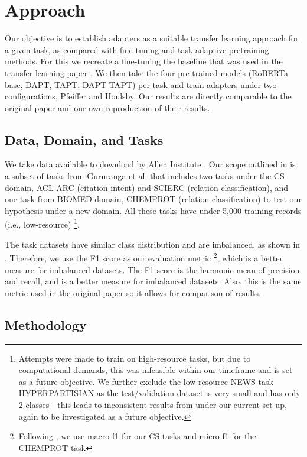 \documentclass[10pt,twocolumn,letterpaper]{article}
\begin{document}
\section{Approach}
Our objective is to establish adapters as a suitable transfer learning approach for a given task, as compared with fine-tuning and task-adaptive pretraining methods. For this we recreate a fine-tuning the baseline that was used in the transfer learning paper \cite{gururangan2020dont}. We then take the four pre-trained models (RoBERTa base, DAPT, TAPT, DAPT-TAPT) per task and train adapters under two configurations, Pfeiffer and Houlsby. Our results are directly comparable to the original paper \cite{gururangan2020dont} and our own reproduction of their results.

\subsection{Data, Domain, and Tasks} 
We take data available to download by Allen Institute \cite{allenai_dont_stop_pretraining}. Our scope outlined in  is a subset of tasks from Gururanga et al. \cite{gururangan2020dont} that includes two tasks under the CS domain, ACL-ARC (citation-intent) and SCIERC (relation classification), and one task from BIOMED domain, CHEMPROT (relation classification) to test our hypothesis under a new domain. All these tasks have under 5,000 training records (i.e., low-resource) \footnote{Attempts were made to train on high-resource tasks, but due to computational demands, this was infeasible within our timeframe and is set as a future objective. We further exclude the low-resource NEWS task HYPERPARTISIAN as the test/validation dataset is very small and has only 2 classes - this leads to inconsistent results from \cite{allenai_dont_stop_pretraining} under our current set-up, again to be investigated as a future objective.}.

The task datasets have similar class distribution and are imbalanced, as shown in . Therefore, we use the F1 score as our evaluation metric \footnote{Following \cite{gururangan2020dont}, we use macro-f1 for our CS tasks and micro-f1 for the CHEMPROT task}, which is a better measure for imbalanced datasets. The F1 score is the harmonic mean of precision and recall, and is a better measure for imbalanced datasets. Also, this is the same metric used in the original paper \cite{gururangan2020dont} so it allows for comparison of results.

\subsection{Methodology} 
\end{document}
